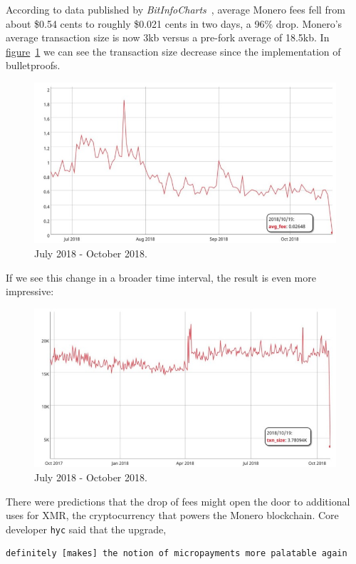 According to data published by \emph{BitInfoCharts}~\cite{bitinfocharts}, average Monero fees fell from about \$0.54 cents to roughly \$0.021 cents in two days, a 96\% drop. Monero’s average transaction size is now 3kb versus a pre-fork average of 18.5kb. In \hyperref[fig:bulletproof_2]{figure}~\ref{fig:bulletproof_2} we can see the transaction size decrease since the implementation of bulletproofs.
\vspace{0.3cm}
\begin{figure}[H]
  \centering
  \includegraphics[width=0.8 \columnwidth,keepaspectratio]{Images/Monero/bulletproofs_2.jpg}
  \caption{July 2018 - October 2018.~\cite{bitinfocharts}}
  \label{fig:bulletproof_2}
\end{figure}
\vspace{0.3cm}
If we see this change in a broader time interval, the result is even more impressive:
\vspace{0.3cm}
\begin{figure}[H]
  \centering
  \includegraphics[width=0.8 \columnwidth,keepaspectratio]{Images/Monero/bulletproofs_1.jpg}
  \caption{July 2018 - October 2018.~\cite{bitinfocharts}}
  \label{fig:bulletproof_1}
\end{figure}
\pagebreak

There were predictions that the drop of fees might open the door to additional uses for XMR, the cryptocurrency that powers the Monero blockchain. Core developer \verb|hyc| said that the upgrade,
\begin{verbatim}
definitely [makes] the notion of micropayments more palatable again
\end{verbatim}

